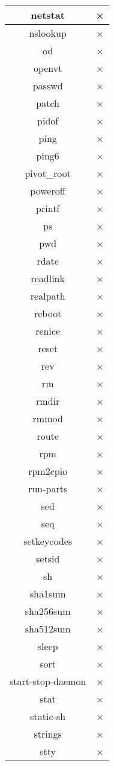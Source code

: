 \begin{longtable}{cc}
netstat & × \\ \hline
nslookup & × \\ \hline
od & × \\ \hline
openvt & × \\ \hline
passwd & × \\ \hline
patch & × \\ \hline
pidof & × \\ \hline
ping & × \\ \hline
ping6 & × \\ \hline
pivot\_root & × \\ \hline
poweroff & × \\ \hline
printf & × \\ \hline
ps & × \\ \hline
pwd & × \\ \hline
rdate & × \\ \hline
readlink & × \\ \hline
realpath & × \\ \hline
reboot & × \\ \hline
renice & × \\ \hline
reset & × \\ \hline
rev & × \\ \hline
rm & × \\ \hline
rmdir & × \\ \hline
rmmod & × \\ \hline
route & × \\ \hline
rpm & × \\ \hline
rpm2cpio & × \\ \hline
run-parts & × \\ \hline
sed & × \\ \hline
seq & × \\ \hline
setkeycodes & × \\ \hline
setsid & × \\ \hline
sh & × \\ \hline
sha1sum & × \\ \hline
sha256sum & × \\ \hline
sha512sum & × \\ \hline
sleep & × \\ \hline
sort & × \\ \hline
start-stop-daemon & × \\ \hline
stat & × \\ \hline
static-sh & × \\ \hline
strings & × \\ \hline
stty & × \\ \hline

\end{longtable}
